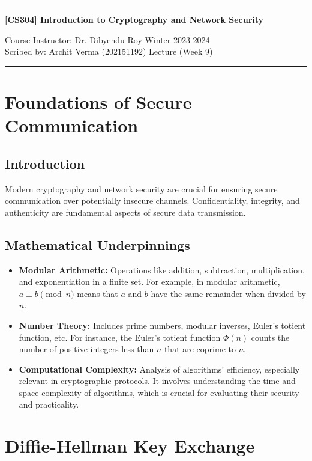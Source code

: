 \documentclass[11pt]{article}
\begin{document}
\noindent
\rule{\textwidth}{1pt}
\begin{center}
\bf [CS304] Introduction to Cryptography and Network Security
\end{center}
Course Instructor: Dr. Dibyendu Roy \hfill Winter 2023-2024\\
Scribed by: Archit Verma (202151192) \hfill Lecture (Week 9)
\\
\rule{\textwidth}{1pt}
\section{Foundations of Secure Communication}



\subsection{Introduction}
Modern cryptography and network security are crucial for ensuring secure communication over potentially insecure channels. Confidentiality, integrity, and authenticity are fundamental aspects of secure data transmission.

\subsection{Mathematical Underpinnings}
\begin{itemize}
    \item \textbf{Modular Arithmetic:} Operations like addition, subtraction, multiplication, and exponentiation in a finite set. For example, in modular arithmetic, $a \equiv b \pmod{n}$ means that $a$ and $b$ have the same remainder when divided by $n$.
    \item \textbf{Number Theory:} Includes prime numbers, modular inverses, Euler’s totient function, etc. For instance, the Euler's totient function $\Phi(n)$ counts the number of positive integers less than $n$ that are coprime to $n$.
    \item \textbf{Computational Complexity:} Analysis of algorithms’ efficiency, especially relevant in cryptographic protocols. It involves understanding the time and space complexity of algorithms, which is crucial for evaluating their security and practicality.
\end{itemize}

\section{Diffie-Hellman Key Exchange}
\end{document}
